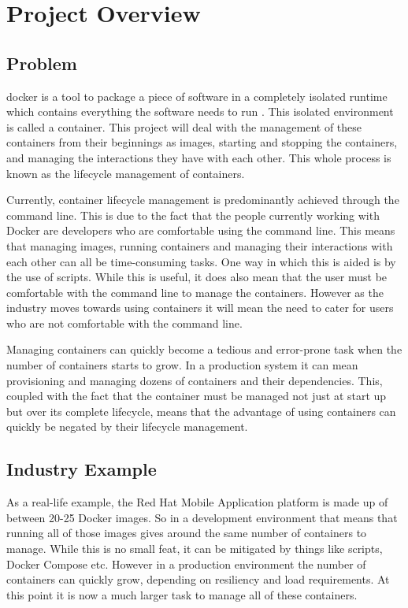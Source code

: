 \section{Project Overview}
\subsection{Problem}
\label{sub:problem}

\gls{docker} is a tool to package a piece of software in a completely isolated runtime which contains everything the software needs to run \citep{WhatDocker}. This isolated environment is called a \gls{container}. This project will deal with the management of these containers from their beginnings as images, starting and stopping the containers, and managing the interactions they have with each other. This whole process is known as the lifecycle management of containers.

Currently, container \gls{lifecycle management} is predominantly achieved through the \gls{command line}. This is due to the fact that the people currently working with Docker are developers who are comfortable using the command line. This means that managing images, running containers and managing their interactions with each other can all be time-consuming tasks. One way in which this is aided is by the use of scripts. While this is useful, it does also mean that the user must be comfortable with the command line to manage the containers. However as the industry moves towards using containers \citep{Datadog2016} it will mean the need to cater for users who are not comfortable with the command line.

Managing containers can quickly become a tedious and error-prone task when the number of containers starts to grow. In a production system it can mean provisioning and managing dozens of containers and their dependencies. This, coupled with the fact that the container must be managed not just at start up but over its complete lifecycle, means that the advantage of using containers can quickly be negated by their lifecycle management.

\subsection{Industry Example}
\label{sub:industry}
As a real-life example, the Red Hat Mobile Application platform \citep{RedHat2016} is made up of between 20-25 Docker images. So in a development environment that means that running all of those images gives around the same number of containers to manage. While this is no small feat, it can be mitigated by things like scripts, Docker Compose etc. However in a production environment the number of containers can quickly grow, depending on resiliency and load requirements. At this point it is now a much larger task to manage all of these containers. 

